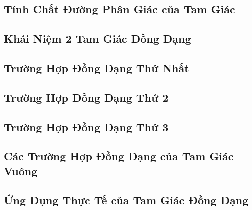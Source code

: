 \documentclass{article}
\numberwithin{equation}{section}
\begin{document}

\subsection{Tính Chất Đường Phân Giác của Tam Giác}


\subsection{Khái Niệm 2 Tam Giác Đồng Dạng}


\subsection{Trường Hợp Đồng Dạng Thứ Nhất}


\subsection{Trường Hợp Đồng Dạng Thứ 2}


\subsection{Trường Hợp Đồng Dạng Thứ 3}


\subsection{Các Trường Hợp Đồng Dạng của Tam Giác Vuông}


\subsection{Ứng Dụng Thực Tế của Tam Giác Đồng Dạng}

\end{document}
